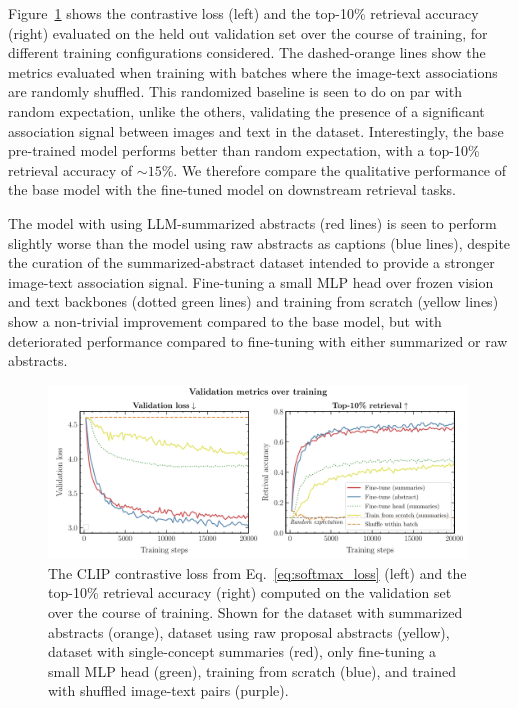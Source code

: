 \documentclass[10pt]{article} %
\begin{document}
Figure~\ref{fig:retrieval_acc} shows the contrastive loss (left) and the top-10\% retrieval accuracy (right) evaluated on the held out validation set over the course of training, for different training configurations considered.
%
The dashed-orange lines show the metrics evaluated when training with batches where the image-text associations are randomly shuffled.
%
This randomized baseline is seen to do on par with random expectation, unlike the others, validating the presence of a significant association signal between images and text in the dataset.
%
Interestingly, the base pre-trained model performs better than random expectation, with a top-10\% retrieval accuracy of $\sim 15\%$.
%
We therefore compare the qualitative performance of the base model with the fine-tuned model on downstream retrieval tasks.

The model with using LLM-summarized abstracts (red lines) is seen to perform slightly worse than the model using raw abstracts as captions (blue lines), despite the curation of the summarized-abstract dataset intended to provide a stronger image-text association signal.
%
Fine-tuning a small MLP head over frozen vision and text backbones (dotted green lines) and training from scratch (yellow lines) show a non-trivial improvement compared to the base model, but with deteriorated performance compared to fine-tuning with either summarized or raw abstracts.

\begin{figure}[!h]
\includegraphics[width=0.99\textwidth]{plots/val_metrics.pdf}
\caption{The CLIP contrastive loss from Eq.~\ref{eq:softmax_loss} (left) and the top-10\% retrieval accuracy (right) computed on the validation set over the course of training. Shown for the dataset with summarized abstracts (orange), dataset using raw proposal abstracts (yellow), dataset with single-concept summaries (red), only fine-tuning a small MLP head (green), training from scratch (blue), and trained with shuffled image-text pairs (purple).}
\label{fig:retrieval_acc}
\end{figure}
\end{document}
